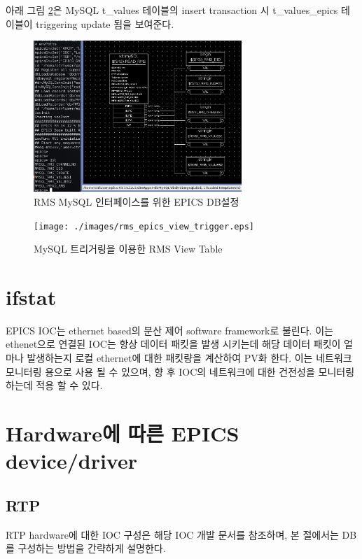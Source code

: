 \documentclass[11pt
  , a4paper
  , article
  , oneside
]{memoir}
\begin{document}
아래 그림 \ref{fig:rms_epics_view_trigger}은 MySQL t\_values 테이블의 insert transaction 시 t\_values\_epics 테이블이 triggering update 됨을 보여준다.

\clearpage

\begin{figure}[h!]
	\centering
	\includegraphics[width=0.7\textwidth]{./images/rms_epics_db.eps}
	\caption{RMS MySQL 인터페이스를 위한 EPICS DB설정}
	\label{fig:rms_epics_db}
\end{figure}

\begin{figure}[h!]
	\centering
	\texttt{[image: ./images/rms\_epics\_view\_trigger.eps]}
	\caption{MySQL 트리거링을 이용한 RMS View Table}
	\label{fig:rms_epics_view_trigger}
\end{figure}

\clearpage

\chapter{ifstat}
EPICS IOC는 ethernet based의 분산 제어 software framework로 불린다. 이는 ethenet으로 연결된 IOC는 항상 데이터 패킷을 발생 시키는데 해당 데이터 패킷이 얼마나 발생하는지 로컬 ethernet에 대한 패킷량을 계산하여 PV화 한다. 이는 네트워크 모니터링 용으로 사용 될 수 있으며, 향 후 IOC의 네트워크에 대한 건전성을 모니터링하는데 적용 할 수 있다.


\chapter{Hardware에 따른 EPICS device/driver}
\section{RTP}
RTP hardware에 대한 IOC 구성은 해당 IOC 개발 문서를 참조하며, 본 절에서는 DB를 구성하는 방법을 간략하게 설명한다.
\end{document}
